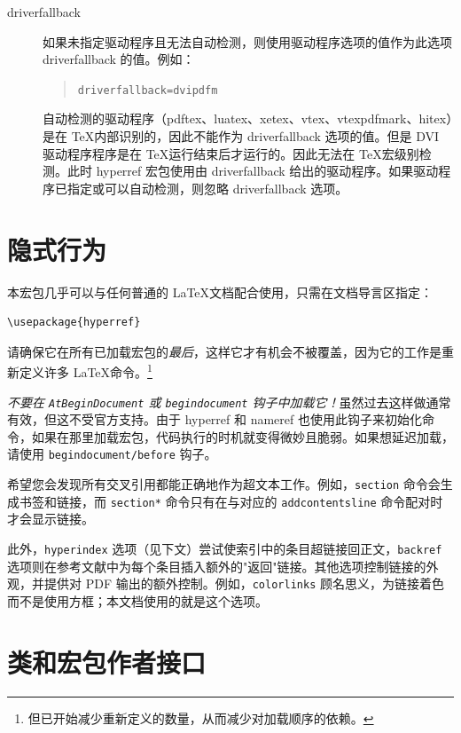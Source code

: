 \documentclass{article}
\newcommand*{\xpackage}[1]{\textsf{#1}}
\newcommand{\bs}{\symbol{'134}}%
\newcommand{\ci}[1]{\texttt{\bs#1}}
\begin{document}
\begin{description}
\item[driverfallback]
  如果未指定驱动程序且无法自动检测，则使用驱动程序选项的值作为此选项 \textsf{driverfallback} 的值。例如：
  \begin{quote}
    \texttt{driverfallback=dvipdfm}
  \end{quote}
  自动检测的驱动程序（\textsf{pdftex}、\textsf{luatex}、\textsf{xetex}、\textsf{vtex}、\textsf{vtexpdfmark}、\textsf{hitex}）是在 \TeX 内部识别的，因此不能作为 \textsf{driverfallback} 选项的值。但是 DVI 驱动程序程序是在 \TeX 运行结束后才运行的。因此无法在 \TeX 宏级别检测。此时 \xpackage{hyperref} 宏包使用由 \textsf{driverfallback} 给出的驱动程序。如果驱动程序已指定或可以自动检测，则忽略 \textsf{driverfallback} 选项。
\end{description}

\section{隐式行为}

本宏包几乎可以与任何普通的 \LaTeX 文档配合使用，只需在文档导言区指定：

\begin{verbatim}
\usepackage{hyperref}
\end{verbatim}

请确保它在所有已加载宏包的\emph{最后}，这样它才有机会不被覆盖，因为它的工作是重新定义许多 \LaTeX 命令。\footnote{但已开始减少重新定义的数量，从而减少对加载顺序的依赖。}

\emph{不要在 \ci{AtBeginDocument} 或 \texttt{begindocument} 钩子中加载它！}虽然过去这样做通常有效，但这不受官方支持。由于 \xpackage{hyperref} 和 \xpackage{nameref} 也使用此钩子来初始化命令，如果在那里加载宏包，代码执行的时机就变得微妙且脆弱。如果想延迟加载，请使用 \texttt{begindocument/before} 钩子。

希望您会发现所有交叉引用都能正确地作为超文本工作。例如，\ci{section} 命令会生成书签和链接，而 \ci{section*} 命令只有在与对应的 \ci{addcontentsline} 命令配对时才会显示链接。

此外，\texttt{hyperindex} 选项（见下文）尝试使索引中的条目超链接回正文，\texttt{backref} 选项则在参考文献中为每个条目插入额外的"返回"链接。其他选项控制链接的外观，并提供对 PDF 输出的额外控制。例如，\texttt{colorlinks} 顾名思义，为链接着色而不是使用方框；本文档使用的就是这个选项。

\section{类和宏包作者接口}
\end{document}
